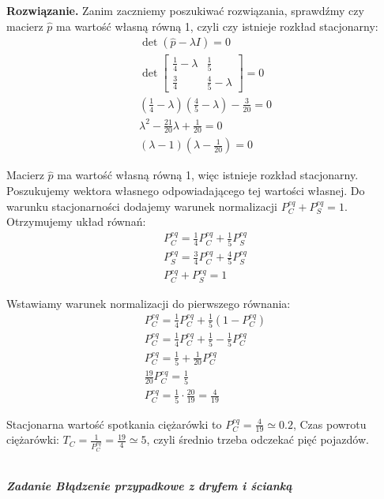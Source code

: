 \documentclass[11pt,a4paper]{article}
\newcounter{zadanie}\newcommand{\zadanie}[1][]{\addtocounter{zadanie}{1} ~\\  {\bf \emph{Zadanie \arabic{zadanie} #1 }} \\}
\newenvironment{solution}{\vspace{1cm} \par\textbf{Rozwiązanie.} \vspace{1cm}}{}
\begin{document}
\begin{solution}
Zanim zaczniemy poszukiwać rozwiązania, sprawdźmy czy macierz $\hat{p}$ 
ma wartość własną równą 1, czyli czy istnieje rozkład stacjonarny:
\begin{align*}
    \det(\hat{p} - \lambda I) = 0 \\
    \det\begin{bmatrix}
        \frac{1}{4} - \lambda & \frac{1}{5} \\
        \frac{3}{4} & \frac{4}{5} - \lambda
    \end{bmatrix} = 0 \\
    (\frac{1}{4} - \lambda)(\frac{4}{5} - \lambda) - \frac{3}{20} = 0 \\
    \lambda^2 - \frac{21}{20} \lambda + \frac{1}{20} = 0 \\
    (\lambda - 1)(\lambda - \frac{1}{20}) = 0
\end{align*}

Macierz $\hat{p}$ ma wartość własną równą 1, więc istnieje rozkład stacjonarny.
Poszukujemy wektora własnego odpowiadającego tej wartości własnej.
Do warunku stacjonarności dodajemy warunek normalizacji $P_C^{eq} + P_S^{eq} = 1$.
Otrzymujemy układ równań:
\begin{align*}
    P_C^{eq} = \frac{1}{4} P_C^{eq} + \frac{1}{5} P_S^{eq} \\
    P_S^{eq} = \frac{3}{4} P_C^{eq} + \frac{4}{5} P_S^{eq} \\
    P_C^{eq} + P_S^{eq} = 1
\end{align*}

Wstawiamy warunek normalizacji do pierwszego równania:
\begin{align*}
    P_C^{eq} = \frac{1}{4} P_C^{eq} + \frac{1}{5} (1 - P_C^{eq}) \\
    P_C^{eq} = \frac{1}{4} P_C^{eq} + \frac{1}{5} - \frac{1}{5} P_C^{eq} \\
    P_C^{eq} = \frac{1}{5} + \frac{1}{20} P_C^{eq} \\
    \frac{19}{20} P_C^{eq} = \frac{1}{5} \\
    P_C^{eq} = \frac{1}{5} \cdot \frac{20}{19} = \frac{4}{19}
\end{align*}

Stacjonarna wartość spotkania ciężarówki to $P_C^{eq} = \frac{4}{19} \simeq 0.2$, 
Czas powrotu ciężarówki: $T_C = \frac{1}{P_C^{eq}} = \frac{19}{4} \simeq 5$, 
czyli średnio trzeba odczekać pięć pojazdów.

\newpage
\end{solution}
\zadanie[Błądzenie przypadkowe z dryfem i ścianką]
\end{document}
